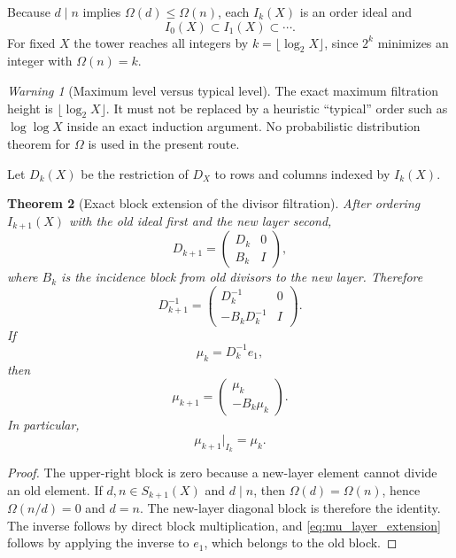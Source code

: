 \documentclass[11pt]{amsart}
\numberwithin{equation}{section}
\theoremstyle{plain}
\newtheorem{theorem}{Theorem}[section]
\theoremstyle{definition}
\theoremstyle{remark}
\newtheorem{warning}[theorem]{Warning}
\begin{document}
Because $d\mid n$ implies $\Omega(d)\le\Omega(n)$, each $I_k(X)$ is an order ideal and
\[
I_0(X)\subset I_1(X)\subset\cdots.
\]
For fixed $X$ the tower reaches all integers by
$k=\lfloor\log_2X\rfloor$, since $2^k$ minimizes an integer with $\Omega(n)=k$.

\begin{warning}[Maximum level versus typical level]
\label{warn:omega_max_typical}
The exact maximum filtration height is $\lfloor\log_2X\rfloor$.  It must not be replaced by a
heuristic ``typical'' order such as $\log\log X$ inside an exact induction argument.  No
probabilistic distribution theorem for $\Omega$ is used in the present route.
\end{warning}

Let $D_k(X)$ be the restriction of $D_X$ to rows and columns indexed by $I_k(X)$.

\begin{theorem}[Exact block extension of the divisor filtration]
\label{thm:block_divisor_extension}
After ordering $I_{k+1}(X)$ with the old ideal first and the new layer second,
\begin{equation}
D_{k+1}
=
\begin{pmatrix}
D_k&0\\
B_k&I
\end{pmatrix},
\label{eq:D_block_extension}
\end{equation}
where $B_k$ is the incidence block from old divisors to the new layer.  Therefore
\begin{equation}
D_{k+1}^{-1}
=
\begin{pmatrix}
D_k^{-1}&0\\
-B_kD_k^{-1}&I
\end{pmatrix}.
\label{eq:Dinv_block_extension}
\end{equation}
If
\[
\mu_k=D_k^{-1}e_1,
\]
then
\begin{equation}
\boxed{
\mu_{k+1}
=
\begin{pmatrix}
\mu_k\\
-B_k\mu_k
\end{pmatrix}.
}
\label{eq:mu_layer_extension}
\end{equation}
In particular,
\begin{equation}
\mu_{k+1}|_{I_k}=\mu_k.
\label{eq:coherent_restriction}
\end{equation}
\end{theorem}

\begin{proof}
The upper-right block is zero because a new-layer element cannot divide an old element.
If $d,n\in S_{k+1}(X)$ and $d\mid n$, then
$\Omega(d)=\Omega(n)$, hence $\Omega(n/d)=0$ and $d=n$.  The new-layer diagonal block is therefore
the identity.  The inverse follows by direct block multiplication, and
\eqref{eq:mu_layer_extension} follows by applying the inverse to $e_1$, which belongs to the old
block.
\end{proof}
\end{document}
